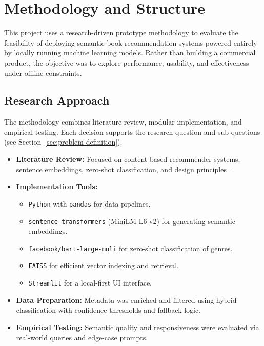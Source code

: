 \chapter{Methodology and Structure}
\label{chapter:methodology}

This project uses a research-driven prototype methodology to evaluate the feasibility of deploying semantic book recommendation systems powered entirely by locally running machine learning models. 
Rather than building a commercial product, the objective was to explore performance, usability, and effectiveness under offline constraints.

\section{Research Approach}
\label{sec:research-approach}

The methodology combines literature review, modular implementation, and empirical testing. Each decision supports the research question and sub-questions (see Section~\ref{sec:problem-definition}).

\begin{itemize}
    \item \textbf{Literature Review:} Focused on content-based recommender systems, sentence embeddings, zero-shot classification, and design principles \cite{handson-ml}.

    \item \textbf{Implementation Tools:}
    \begin{itemize}
        \item \texttt{Python} with \texttt{pandas} for data pipelines.
        \item \texttt{sentence-transformers} (MiniLM-L6-v2) for generating semantic embeddings.
        \item \texttt{facebook/bart-large-mnli} for zero-shot classification of genres.
        \item \texttt{FAISS} for efficient vector indexing and retrieval.
        \item \texttt{Streamlit} for a local-first UI interface.
    \end{itemize}

    \item \textbf{Data Preparation:} Metadata was enriched and filtered using hybrid classification with confidence thresholds and fallback logic.

    \item \textbf{Empirical Testing:} Semantic quality and responsiveness were evaluated via real-world queries and edge-case prompts.
\end{itemize}

